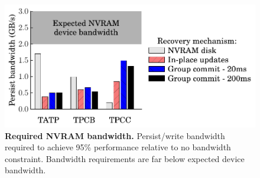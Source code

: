 \begin{figure}
  \centering
  \includegraphics[width=.9\linewidth]{OLTP_eval/Bandwidth.pdf}
  \caption{\textbf{Required NVRAM bandwidth.} Persist/write bandwidth required to achieve 95\% performance relative to no bandwidth constraint.  Bandwidth requirements are far below expected device bandwidth.}
  \label{fig::Bandwidth}
\end{figure}
